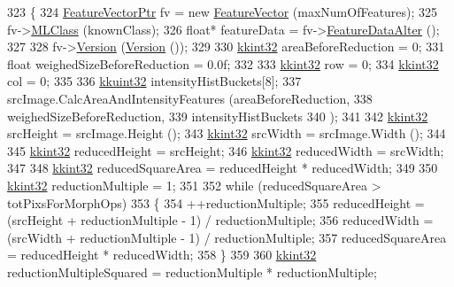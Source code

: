 \begin{DoxyCode}
323 \{
324   \hyperlink{class_k_k_m_l_l_1_1_feature_vector}{FeatureVectorPtr}  fv = \textcolor{keyword}{new} \hyperlink{class_k_k_m_l_l_1_1_feature_vector}{FeatureVector} (maxNumOfFeatures);
325   fv->\hyperlink{class_k_k_m_l_l_1_1_feature_vector_a3c8fe002c6e868f8c00059c004fb32fd}{MLClass} (knownClass);
326   \textcolor{keywordtype}{float}*  featureData = fv->\hyperlink{class_k_k_m_l_l_1_1_feature_vector_a1de79e775d2bb2ddde4016a1269b5431}{FeatureDataAlter} ();
327 
328   fv->\hyperlink{class_k_k_m_l_l_1_1_feature_vector_a17650be71b83695d35d34029257652ea}{Version} (\hyperlink{class_k_k_m_l_l_1_1_gray_scale_images_f_v_producer_aaa9437b36ae935eec369341935fd21f9}{Version} ());
329 
330   \hyperlink{namespace_k_k_b_a8fa4952cc84fda1de4bec1fbdd8d5b1b}{kkint32} areaBeforeReduction = 0;
331   \textcolor{keywordtype}{float}  weighedSizeBeforeReduction = 0.0f;
332 
333   \hyperlink{namespace_k_k_b_a8fa4952cc84fda1de4bec1fbdd8d5b1b}{kkint32} row = 0;
334   \hyperlink{namespace_k_k_b_a8fa4952cc84fda1de4bec1fbdd8d5b1b}{kkint32} col = 0;
335 
336   \hyperlink{namespace_k_k_b_af8d832f05c54994a1cce25bd5743e19a}{kkuint32}  intensityHistBuckets[8];
337   srcImage.CalcAreaAndIntensityFeatures (areaBeforeReduction, 
338                                          weighedSizeBeforeReduction,
339                                          intensityHistBuckets
340                                         );
341 
342   \hyperlink{namespace_k_k_b_a8fa4952cc84fda1de4bec1fbdd8d5b1b}{kkint32} srcHeight = srcImage.Height ();
343   \hyperlink{namespace_k_k_b_a8fa4952cc84fda1de4bec1fbdd8d5b1b}{kkint32} srcWidth  = srcImage.Width  ();
344 
345   \hyperlink{namespace_k_k_b_a8fa4952cc84fda1de4bec1fbdd8d5b1b}{kkint32} reducedHeight = srcHeight;
346   \hyperlink{namespace_k_k_b_a8fa4952cc84fda1de4bec1fbdd8d5b1b}{kkint32} reducedWidth  = srcWidth;
347 
348   \hyperlink{namespace_k_k_b_a8fa4952cc84fda1de4bec1fbdd8d5b1b}{kkint32} reducedSquareArea = reducedHeight * reducedWidth;
349 
350   \hyperlink{namespace_k_k_b_a8fa4952cc84fda1de4bec1fbdd8d5b1b}{kkint32} reductionMultiple = 1;
351 
352   \textcolor{keywordflow}{while}  (reducedSquareArea > totPixsForMorphOps)
353   \{
354     ++reductionMultiple;
355     reducedHeight = (srcHeight + reductionMultiple - 1) / reductionMultiple;
356     reducedWidth  = (srcWidth  + reductionMultiple - 1) / reductionMultiple;
357     reducedSquareArea = reducedHeight * reducedWidth;
358   \}
359 
360   \hyperlink{namespace_k_k_b_a8fa4952cc84fda1de4bec1fbdd8d5b1b}{kkint32}  reductionMultipleSquared = reductionMultiple * reductionMultiple;

\end{DoxyCode}
